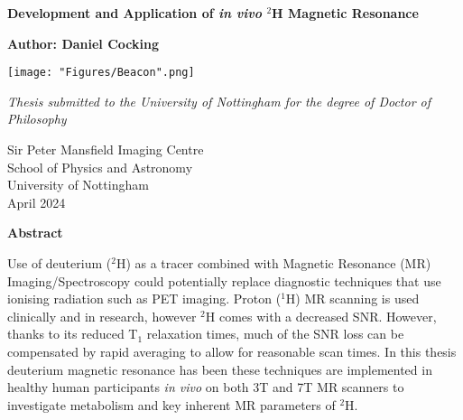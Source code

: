 \documentclass[12pt,english]{report}
\begin{document}
 

\setlength{\headheight}{25pt}

\begin{titlepage}
   \begin{center}
 
       \textbf{\huge{Development and Application of \textit{in vivo} $^2$H Magnetic Resonance}}
 
       \vspace{1cm}
 
       \huge{\textbf{Author: Daniel Cocking} \\}
       
       \vspace{1.5cm}
       \texttt{[image: "Figures/Beacon".png]}
       \vspace{1cm}
       
       \Large{\emph{Thesis submitted to the University of Nottingham for the degree of Doctor of Philosophy}} 
 
 \vspace{2cm}
 
       Sir Peter Mansfield Imaging Centre \\
       School of Physics and Astronomy\\
       University of Nottingham\\
       April 2024
 
   \end{center}
\end{titlepage}
\thispagestyle{empty}
\vspace*{\fill}

\newpage
\thispagestyle{plain}
\setcounter{page}{1}
\begin{center}
    \textbf{Abstract}
\end{center}
Use of deuterium ($^2$H) as a tracer combined with Magnetic Resonance (MR) Imaging/Spectroscopy could potentially replace diagnostic techniques that use ionising radiation such as \ac{PET} imaging. Proton ($^1$H) MR scanning is used clinically and in research, however $^2$H comes with a decreased \ac{SNR}. However, thanks to its reduced T$_1$ relaxation times, much of the \ac{SNR} loss can be compensated by rapid averaging to allow for reasonable scan times. In this thesis deuterium magnetic resonance has been these techniques are implemented in healthy human participants \textit{in vivo} on both 3T and 7T MR scanners to investigate metabolism and key inherent MR parameters of $^2$H.
\end{document}

